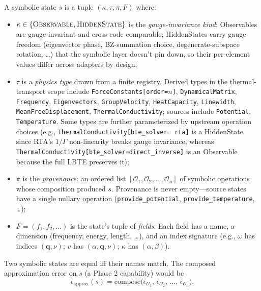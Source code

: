 \documentclass[11pt,a4paper]{article}
\begin{document}
A symbolic state $s$ is a tuple $(\kappa, \tau, \pi, F)$ where:
\begin{itemize}[leftmargin=2em]
  \item $\kappa \in \{\textsc{Observable}, \textsc{HiddenState}\}$ is the
        \emph{gauge-invariance kind}: Observables are gauge-invariant and cross-code
        comparable; HiddenStates carry gauge freedom (eigenvector phase, BZ-summation
        choice, degenerate-subspace rotation, …) that the symbolic layer doesn't pin down,
        so their per-element values differ across adapters by design;
  \item $\tau$ is a \emph{physics type} drawn from a finite registry. Derived types in
        the thermal-transport scope include \texttt{ForceConstants[order=$n$]},
        \texttt{DynamicalMatrix}, \texttt{Frequency}, \texttt{Eigenvectors},
        \texttt{GroupVelocity}, \texttt{HeatCapacity}, \texttt{Linewidth},
        \texttt{MeanFreeDisplacement}, \texttt{ThermalConductivity}; sources include
        \texttt{Potential}, \texttt{Temperature}. Some types are further parameterized
        by upstream operation choices (e.g., \texttt{ThermalConductivity[bte\_solver=
        rta]} is a HiddenState since RTA's $1/\Gamma$ non-linearity breaks gauge
        invariance, whereas \texttt{ThermalConductivity[bte\_solver=direct\_inverse]}
        is an Observable because the full LBTE preserves it);
  \item $\pi$ is the \emph{provenance}: an ordered list $[\mathcal{O}_1, \mathcal{O}_2,
        \ldots, \mathcal{O}_n]$ of symbolic operations whose composition produced $s$.
        Provenance is never empty---source states have a single nullary operation
        (\texttt{provide\_potential}, \texttt{provide\_temperature}, \ldots);
  \item $F = (f_1, f_2, \ldots)$ is the state's tuple of \emph{fields}. Each field has
        a name, a dimension (frequency, energy, length, …), and an index signature
        (e.g., $\omega$ has indices $(\mathbf{q}, \nu)$; $v$ has $(\alpha, \mathbf{q},
        \nu)$; $\kappa$ has $(\alpha, \beta)$).
\end{itemize}
Two symbolic states are equal iff their names match. The composed approximation error
on $s$ (a Phase 2 capability) would be
\begin{equation}
  \epsilon_{\text{approx}}(s) = \mathrm{compose}\bigl(\epsilon_{\mathcal{O}_1},\, \epsilon_{\mathcal{O}_2},\, \ldots,\, \epsilon_{\mathcal{O}_n}\bigr).
\end{equation}
\end{document}

